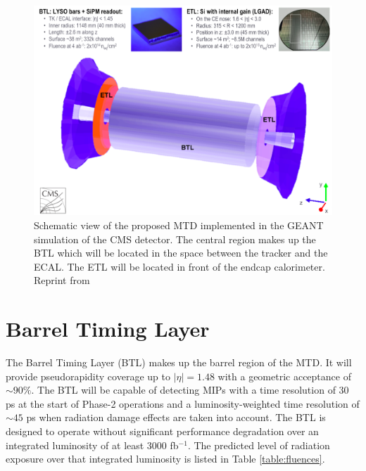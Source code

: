 \begin{figure}[h]
	\centering
	\includegraphics[width=1.0\linewidth]{Figures/MTD_overview}
	\caption[Schematic view of MTD]{Schematic view of the proposed MTD implemented in the GEANT simulation of the CMS detector. The central region makes up the BTL which will be located in the space between the tracker and the ECAL. The ETL will be located in front of the endcap calorimeter. Reprint from }
	\label{fig:mtdoverview}
\end{figure}




\section{Barrel Timing Layer}
 The Barrel Timing Layer (BTL) makes up the barrel region of the MTD.  It will provide pseudorapidity coverage up to $|\eta| = 1.48$ with a geometric acceptance of $\sim 90\%$.  The BTL will be capable of detecting MIPs with a time resolution of 30 ps at the start of Phase-2 operations and a luminosity-weighted time resolution of $\sim45$ ps when radiation damage effects are taken into account.  The BTL is designed to operate without significant performance degradation over an integrated luminosity of at least 3000 fb$^{-1}$.  The predicted level of radiation exposure over that integrated luminosity is listed in Table \ref{table:fluences}.
 
